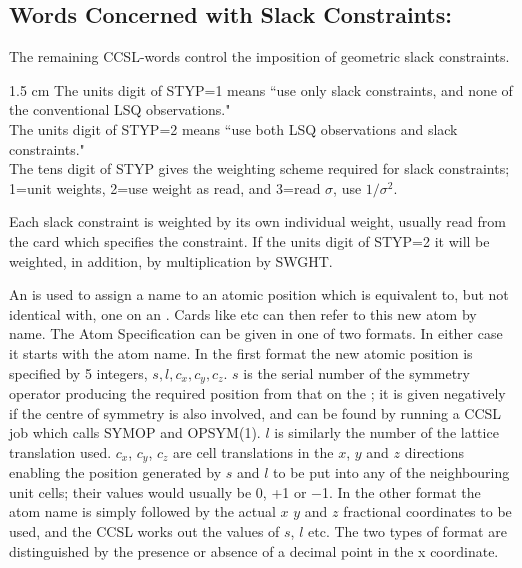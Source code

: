 \subsection{Words Concerned with Slack Constraints:}
\par 
The remaining CCSL-words control the imposition of geometric slack 
constraints.
\par   
{}
\begin{varindent} {1.5 cm}
The units digit of STYP=1 means ``use only slack constraints,
and none of the conventional LSQ observations."\\
The units digit of STYP=2 means ``use both LSQ observations and
slack constraints."\\
The tens digit of STYP gives the weighting scheme required for
slack constraints;  1=unit weights, 2=use weight as read,
and 3=read $\sigma$, use $1/\sigma^2$.
\end{varindent}\p
\begin{varindent}{1 cm} 
Each slack constraint is weighted by its own individual weight,
          usually read from the card which specifies the constraint.  
If the units digit of STYP=2
it will be weighted, in addition, by multiplication by SWGHT.\\
\end{varindent}
\ssk
\begin{varindent}{1 cm}
An  is used to assign a name to an atomic position which is
equivalent to, but not identical with, one on an .  
Cards like  etc can then refer to this new atom by name.  The Atom Specification
          can be given in one of two formats.  In either case it starts with
the atom name.\p
In the first format the new atomic position is specified by
          5 integers, $s, l, c_x, c_y, c_z$. $s$ is the serial number of the 
          symmetry operator producing the required position from that on 
          the ;  it is given negatively if the centre of symmetry
          is also involved, and can be found by running a CCSL job which 
          calls SYMOP and OPSYM(1).  $l$ is similarly the number of the lattice 
translation used.  $c_x$, $c_y$, $c_z$ are cell translations 
in the $x$, $y$ and $z$ 
          directions enabling the position generated by $s$ and $l$ to be put 
          into any of the neighbouring unit cells;  their values would 
          usually be 0, +1 or $-$1.\p
          In the other format the atom name is simply
          followed by the actual $x$ $y$ and $z$ fractional coordinates to be
          used, and the CCSL works out the values of $s$, $l$ etc.\p
          The two types of format are distinguished by the presence or absence 
of a
          decimal point in the x coordinate.
\end{varindent}\p          
